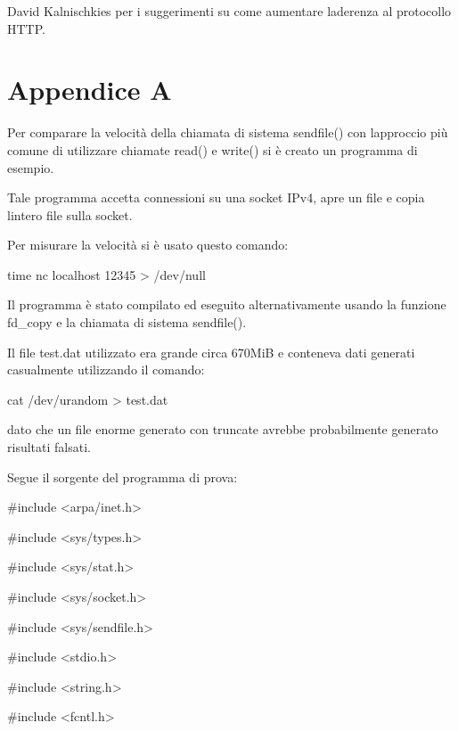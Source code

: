 \documentclass[a4paper,11pt]{article}
\begin{document}
{\sffamily
David Kalnischkies per i suggerimenti su come aumentare
l{\textquotesingle}aderenza al protocollo HTTP.}

\section[Appendice A]{Appendice A}
{\sffamily
Per comparare la velocit\`a della chiamata di sistema sendfile() con
l{\textquotesingle}approccio pi\`u comune di utilizzare chiamate read()
e write() si \`e creato un programma di esempio.}

{\sffamily
Tale programma accetta connessioni su una socket IPv4, apre un file e
copia l{\textquotesingle}intero file sulla socket.}


\bigskip

{\sffamily
Per misurare la velocit\`a si \`e usato questo comando:}

{\ttfamily
time nc localhost 12345 {\textgreater} /dev/null}


\bigskip

{\sffamily
Il programma \`e stato compilato ed eseguito alternativamente usando la
funzione fd\_copy e la chiamata di sistema sendfile().}

{\sffamily
Il file test.dat utilizzato era grande circa 670MiB e conteneva dati
generati casualmente utilizzando il comando:}

{\sffamily
cat /dev/urandom {\textgreater} test.dat}

{\sffamily
dato che un file enorme generato con truncate avrebbe probabilmente
generato risultati falsati.}


\bigskip

{\sffamily
Segue il sorgente del programma di prova:}

{\ttfamily
\#include {\textless}arpa/inet.h{\textgreater}}

{\ttfamily
\#include {\textless}sys/types.h{\textgreater}}

{\ttfamily
\#include {\textless}sys/stat.h{\textgreater}}

{\ttfamily
\#include {\textless}sys/socket.h{\textgreater}}

{\ttfamily
\#include {\textless}sys/sendfile.h{\textgreater}}

{\ttfamily
\#include {\textless}stdio.h{\textgreater}}

{\ttfamily
\#include {\textless}string.h{\textgreater}}

{\ttfamily
\#include {\textless}fcntl.h{\textgreater}}
\end{document}
